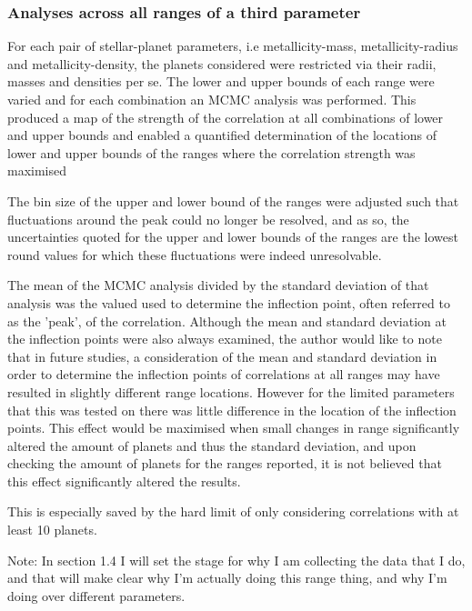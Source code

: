\documentclass[a4paper,twocolumn,12pt]{article}
\begin{document}
\subsubsection{Analyses across all ranges of a third parameter}
\label{subsection: Ranges}
For each pair of stellar-planet parameters, i.e metallicity-mass, metallicity-radius and metallicity-density, the planets considered were restricted via their radii, masses and densities per se. The lower and upper bounds of each range were varied and for each combination an MCMC analysis was performed. This produced a map of the strength of the correlation at all combinations of lower and upper bounds and enabled a quantified determination of the locations of lower and upper bounds of the ranges where the correlation strength was maximised %

The bin size of the upper and lower bound of the ranges were adjusted such that fluctuations around the peak could no longer be resolved, and as so, the uncertainties quoted for the upper and lower bounds of the ranges are the lowest round values for which these fluctuations were indeed unresolvable.

The mean of the MCMC analysis divided by the standard deviation of that analysis was the valued used to determine the inflection point, often referred to as the 'peak', of the correlation. Although the mean and standard deviation at the inflection points were also always examined, the author would like to note that in future studies, a consideration of the mean and standard deviation in order to determine the inflection points of correlations at all ranges may have resulted in slightly different range locations. However for the limited parameters that this was tested on there was little difference in the location of the inflection points. This effect would be maximised when small changes in range significantly altered the amount of planets and thus the standard deviation, and upon checking the amount of planets for the ranges reported, it is not believed that this effect significantly altered the results.

This is especially saved by the hard limit of only considering correlations with at least 10 planets.

Note: In section 1.4 I will set the stage for why I am collecting the data that I do, and that will make clear why I'm actually doing this range thing, and why I'm doing over different parameters.
\end{document}
